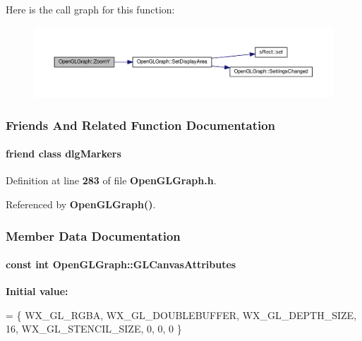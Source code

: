 Here is the call graph for this function\+:
\nopagebreak
\begin{figure}[H]
\begin{center}
\leavevmode
\includegraphics[width=350pt]{d9/d73/classOpenGLGraph_a446a0ea1b2953bd6735a99e7b87256cc_cgraph}
\end{center}
\end{figure}




\subsubsection{Friends And Related Function Documentation}
\paragraph[{dlg\+Markers}]{\setlength{\rightskip}{0pt plus 5cm}friend class {\bf dlg\+Markers}\hspace{0.3cm}{\ttfamily [friend]}}\label{classOpenGLGraph_a59ced3369225075504cb3e878af3ede0}


Definition at line {\bf 283} of file {\bf Open\+G\+L\+Graph.\+h}.



Referenced by {\bf Open\+G\+L\+Graph()}.



\subsubsection{Member Data Documentation}
\paragraph[{G\+L\+Canvas\+Attributes}]{\setlength{\rightskip}{0pt plus 5cm}const {\bf int} Open\+G\+L\+Graph\+::\+G\+L\+Canvas\+Attributes\hspace{0.3cm}{\ttfamily [static]}}\label{classOpenGLGraph_aa27bc2fd04977b238a14c39d22042615}
{\bfseries Initial value\+:}
\begin{DoxyCode}
= \{
    WX\_GL\_RGBA,
    WX\_GL\_DOUBLEBUFFER,
    WX\_GL\_DEPTH\_SIZE, 16,
    WX\_GL\_STENCIL\_SIZE, 0,
    0, 0 \}
\end{DoxyCode}


